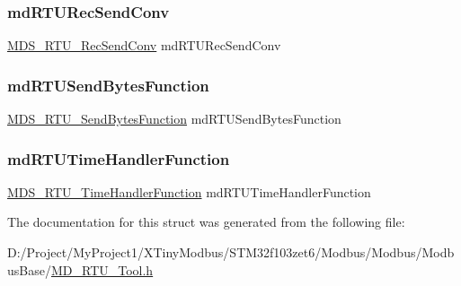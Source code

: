 \mbox{\label{struct_p_modbus_base_a5f3eb3756dbefa404fb29004d844a531}} 
\subsubsection{\texorpdfstring{md\+R\+T\+U\+Rec\+Send\+Conv}{mdRTURecSendConv}}
{\footnotesize\ttfamily \mbox{\hyperlink{_m_d___r_t_u___tool_8h_a3c018adc9939498dee8cda0acd6a23a2}{M\+D\+S\+\_\+\+R\+T\+U\+\_\+\+Rec\+Send\+Conv}} md\+R\+T\+U\+Rec\+Send\+Conv}

\mbox{\label{struct_p_modbus_base_a6501e05a4890a091acbb26a7d6b8805e}} 
\subsubsection{\texorpdfstring{md\+R\+T\+U\+Send\+Bytes\+Function}{mdRTUSendBytesFunction}}
{\footnotesize\ttfamily \mbox{\hyperlink{_m_d___r_t_u___tool_8h_a772570d4938ab57b56e3a0ffc9d5dc07}{M\+D\+S\+\_\+\+R\+T\+U\+\_\+\+Send\+Bytes\+Function}} md\+R\+T\+U\+Send\+Bytes\+Function}

\mbox{\label{struct_p_modbus_base_a6a04ec0ec269e25d456ad73bded75012}} 
\subsubsection{\texorpdfstring{md\+R\+T\+U\+Time\+Handler\+Function}{mdRTUTimeHandlerFunction}}
{\footnotesize\ttfamily \mbox{\hyperlink{_m_d___r_t_u___tool_8h_abff31b0ee2eb0ef8f7aea335d64a2177}{M\+D\+S\+\_\+\+R\+T\+U\+\_\+\+Time\+Handler\+Function}} md\+R\+T\+U\+Time\+Handler\+Function}



The documentation for this struct was generated from the following file\+:\begin{DoxyCompactItemize}
\item 
D\+:/\+Project/\+My\+Project1/\+X\+Tiny\+Modbus/\+S\+T\+M32f103zet6/\+Modbus/\+Modbus/\+Modbus\+Base/\mbox{\hyperlink{_m_d___r_t_u___tool_8h}{M\+D\+\_\+\+R\+T\+U\+\_\+\+Tool.\+h}}\end{DoxyCompactItemize}
